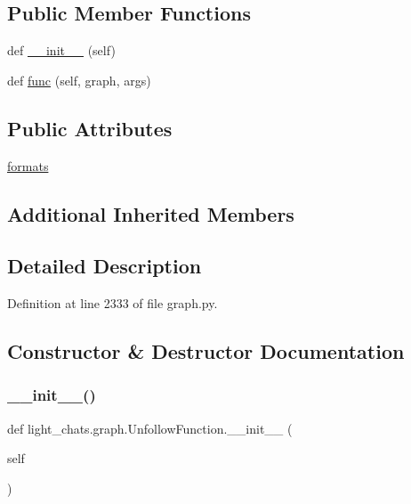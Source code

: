 \subsection*{Public Member Functions}
\begin{DoxyCompactItemize}
\item 
def \hyperlink{classlight__chats_1_1graph_1_1UnfollowFunction_adaf6e40567b940e2b467208eae9507c9}{\+\_\+\+\_\+init\+\_\+\+\_\+} (self)
\item 
def \hyperlink{classlight__chats_1_1graph_1_1UnfollowFunction_a09b37c0a471f8dd65216e434a98983af}{func} (self, graph, args)
\end{DoxyCompactItemize}
\subsection*{Public Attributes}
\begin{DoxyCompactItemize}
\item 
\hyperlink{classlight__chats_1_1graph_1_1UnfollowFunction_a9b7464a052add385de3d685e1627fcf5}{formats}
\end{DoxyCompactItemize}
\subsection*{Additional Inherited Members}


\subsection{Detailed Description}


Definition at line 2333 of file graph.\+py.



\subsection{Constructor \& Destructor Documentation}
\mbox{\label{classlight__chats_1_1graph_1_1UnfollowFunction_adaf6e40567b940e2b467208eae9507c9}} 
\subsubsection{\texorpdfstring{\+\_\+\+\_\+init\+\_\+\+\_\+()}{\_\_init\_\_()}}
{\footnotesize\ttfamily def light\+\_\+chats.\+graph.\+Unfollow\+Function.\+\_\+\+\_\+init\+\_\+\+\_\+ (\begin{DoxyParamCaption}\item[{}]{self }\end{DoxyParamCaption})}



